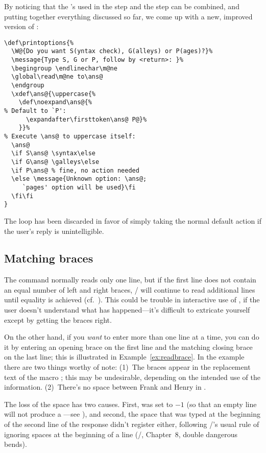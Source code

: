 {By noticing that the 's used in
the  step and the 
step can be combined, and putting together everything
discussed so far, we come up with a new, improved version
of :
 \begin{verbatim}
\def\printoptions{%
  \W@{Do you want S(yntax check), G(alleys) or P(ages)?}%
  \message{Type S, G or P, follow by <return>: }%
  \begingroup \endlinechar\m@ne
  \global\read\m@ne to\ans@
  \endgroup
  \xdef\ans@{\uppercase{%
    \def\noexpand\ans@{%
% Default to `P':
      \expandafter\firsttoken\ans@ P@}%
    }}%
% Execute \ans@ to uppercase itself:
  \ans@
  \if S\ans@ \syntax\else
  \if G\ans@ \galleys\else
  \if P\ans@ % fine, no action needed
  \else \message{Unknown option: \ans@;
     `pages' option will be used}\fi
  \fi\fi
}
\end{verbatim}
 The loop has been discarded in favor of simply taking the normal
default action if the user's reply is unintelligible.

\subsection{Matching braces}
\label{ss:readbrace}
The  command normally reads only one line, but if the first
line does not contain an equal number of left and right braces, \tex/
will continue to read additional lines until equality is achieved
(cf.~).
This could be trouble in interactive use of , if the user
doesn't understand what has happened---it's difficult to extricate
yourself except by getting the braces right.


On the other hand, if you {\em want} to enter more than one line
at a time, you can do it by entering an opening brace on the first
line and the matching closing brace on the last line; this
is illustrated in Example~\ref{ex:readbrace}.
In the example there are two things worthy of note:
(1)~The braces appear in the replacement text of the macro ;
this may be undesirable, depending on the intended use of the
information. (2)~There's no space between
Frank and Henry in .

The loss of the space has two causes. First,  was set to
$-1$ (so that an empty line will not produce a ---see
), and
second, the space that was typed at the beginning of the second
line of the response didn't register either, following \tex/'s
usual rule of ignoring spaces at the beginning of a line
(\texbook/, Chapter~8, double dangerous bends).

}
